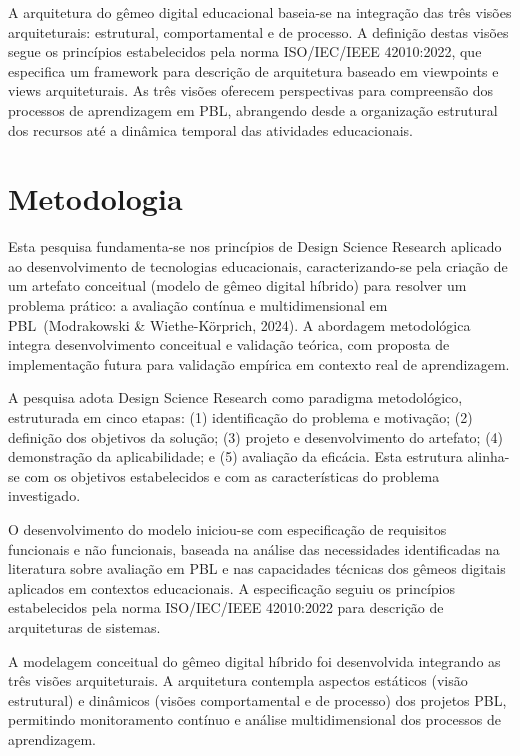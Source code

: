\documentclass[english, spanish, brazilian]{modelo_dt}
\begin{document}
A arquitetura do gêmeo digital educacional baseia-se na integração das três visões arquiteturais: estrutural, comportamental e de processo\@. A definição destas visões segue os princípios estabelecidos pela norma ISO/IEC/IEEE 42010:2022, que especifica um framework para descrição de arquitetura baseado em viewpoints e views arquiteturais\@. As três visões oferecem perspectivas para compreensão dos processos de aprendizagem em PBL, abrangendo desde a organização estrutural dos recursos até a dinâmica temporal das atividades educacionais\@.

\section{Metodologia}

Esta pesquisa fundamenta-se nos princípios de Design Science Research aplicado ao desenvolvimento de tecnologias educacionais, caracterizando-se pela criação de um artefato conceitual (modelo de gêmeo digital híbrido) para resolver um problema prático: a avaliação contínua e multidimensional em PBL~(Modrakowski & Wiethe-Körprich, 2024). A abordagem metodológica integra desenvolvimento conceitual e validação teórica, com proposta de implementação futura para validação empírica em contexto real de aprendizagem.

A pesquisa adota Design Science Research como paradigma metodológico, estruturada em cinco etapas: (1) identificação do problema e motivação; (2) definição dos objetivos da solução; (3) projeto e desenvolvimento do artefato; (4) demonstração da aplicabilidade; e (5) avaliação da eficácia. Esta estrutura alinha-se com os objetivos estabelecidos e com as características do problema investigado.

O desenvolvimento do modelo iniciou-se com especificação de requisitos funcionais e não funcionais, baseada na análise das necessidades identificadas na literatura sobre avaliação em PBL e nas capacidades técnicas dos gêmeos digitais aplicados em contextos educacionais. A especificação seguiu os princípios estabelecidos pela norma ISO/IEC/IEEE 42010:2022 para descrição de arquiteturas de sistemas.

A modelagem conceitual do gêmeo digital híbrido foi desenvolvida integrando as três visões arquiteturais\@. A arquitetura contempla aspectos estáticos (visão estrutural) e dinâmicos (visões comportamental e de processo) dos projetos PBL, permitindo monitoramento contínuo e análise multidimensional dos processos de aprendizagem\@.
\end{document}
